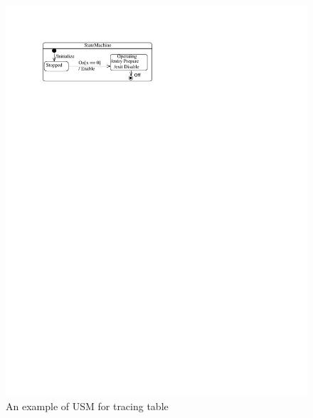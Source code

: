 \begin{figure}
\centering
\includegraphics[clip, trim=2.5cm 22.5cm 10.8cm 2.5cm, width=0.8\columnwidth]{figures/statemachine}
\caption{An example of USM for tracing table} 
\label{fig:statemachuine}
\end{figure}

